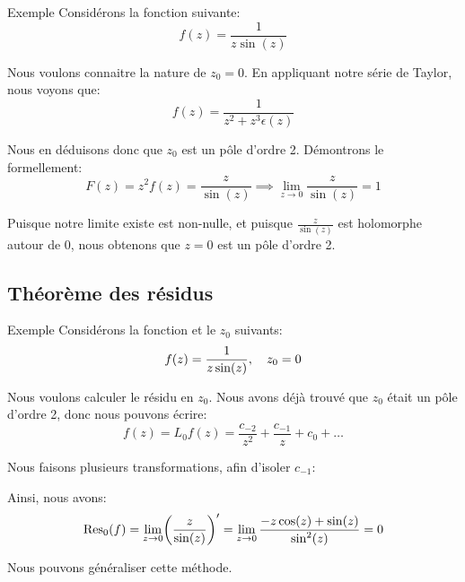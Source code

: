 \documentclass[a4paper]{article}
\begin{document}
\begin{parag}{Exemple}
    Considérons la fonction suivante: 
    \[f\left(z\right) = \frac{1}{z \sin\left(z\right)}\]
    
    Nous voulons connaitre la nature de $z_0 = 0$. En appliquant notre série de Taylor, nous voyons que: 
    \[f\left(z\right) = \frac{1}{z^2 + z^3\epsilon\left(z\right)}\]
    
    Nous en déduisons donc que $z_0$ est un pôle d'ordre 2. Démontrons le formellement:
    \[F\left(z\right) = z^2 f\left(z\right) = \frac{z}{\sin\left(z\right)} \implies \lim_{z \to 0} \frac{z}{\sin\left(z\right)} = 1\]

    Puisque notre limite existe est non-nulle, et puisque $\frac{z}{\sin\left(z\right)}$ est holomorphe autour de $0$, nous obtenons que $z = 0$ est un pôle d'ordre 2.
\end{parag}

\subsection{Théorème des résidus}
\begin{parag}{Exemple}
    Considérons la fonction et le $z_0$ suivants: 
    \[f\left(z\right) = \frac{1}{z \sin\left(z\right)}, \mathspace z_0 = 0\]
    
    Nous voulons calculer le résidu en $z_0$. Nous avons déjà trouvé que $z_0$ était un pôle d'ordre 2, donc nous pouvons écrire: 
    \[f\left(z\right) = L_0 f\left(z\right) = \frac{c_{-2}}{z^2} + \frac{c_{-1}}{z} + c_0 + \ldots\]
    
    Nous faisons plusieurs transformations, afin d'isoler $c_{-1}$: 
    
    Ainsi, nous avons: 
    \[\Res_0\left(f\right) = \lim_{z \to 0} \left(\frac{z}{\sin\left(z\right)}\right)' = \lim_{z \to 0} \frac{-z\cos\left(z\right) + \sin\left(z\right)}{\sin^2\left(z\right)} = 0\]

    Nous pouvons généraliser cette méthode.
\end{parag}
\end{document}
